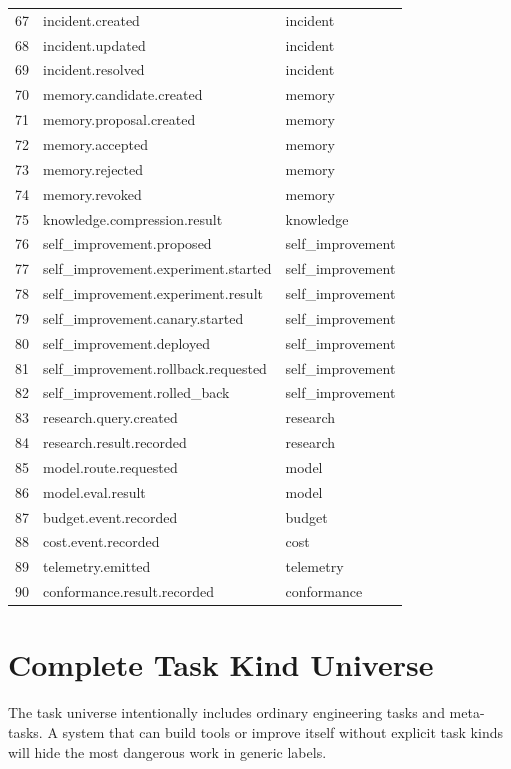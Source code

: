 \documentclass[journal,onecolumn]{IEEEtran}
\begin{document}
\begin{longtable}{p{}p{}p{}}
67 & incident.created & incident\\
68 & incident.updated & incident\\
69 & incident.resolved & incident\\
70 & memory.candidate.created & memory\\
71 & memory.proposal.created & memory\\
72 & memory.accepted & memory\\
73 & memory.rejected & memory\\
74 & memory.revoked & memory\\
75 & knowledge.compression.result & knowledge\\
76 & self\_improvement.proposed & self\_improvement\\
77 & self\_improvement.experiment.started & self\_improvement\\
78 & self\_improvement.experiment.result & self\_improvement\\
79 & self\_improvement.canary.started & self\_improvement\\
80 & self\_improvement.deployed & self\_improvement\\
81 & self\_improvement.rollback.requested & self\_improvement\\
82 & self\_improvement.rolled\_back & self\_improvement\\
83 & research.query.created & research\\
84 & research.result.recorded & research\\
85 & model.route.requested & model\\
86 & model.eval.result & model\\
87 & budget.event.recorded & budget\\
88 & cost.event.recorded & cost\\
89 & telemetry.emitted & telemetry\\
90 & conformance.result.recorded & conformance\\
\bottomrule
\end{longtable}

\section{Complete Task Kind Universe}
The task universe intentionally includes ordinary engineering tasks and meta-tasks. A system that can build tools or improve itself without explicit task kinds will hide the most dangerous work in generic labels.
\end{document}
